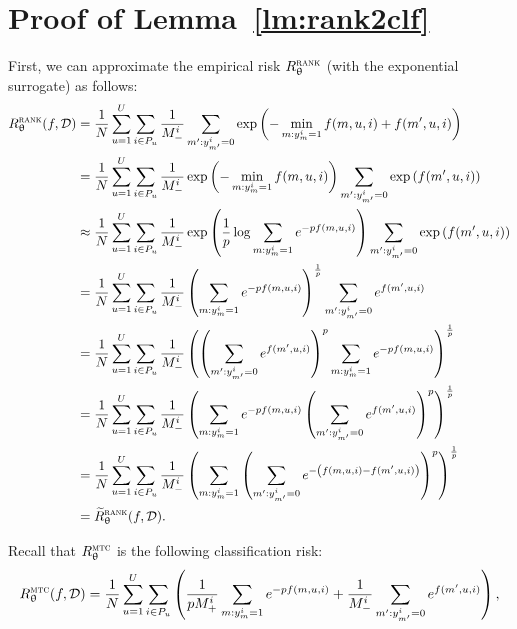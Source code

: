 \section{Proof of Lemma~\ref{lm:rank2clf}}

First, we can approximate the empirical risk $R_{\uptheta}^{\textsc{rank}}$ (with the exponential surrogate) as follows:
\begin{equation*}
\begin{aligned}
R_{\uptheta}^{\textsc{rank}}(f, \mathcal{D})
&= \frac{1}{N} \sum_{u=1}^U \sum_{i \in P_u} \frac{1}{M_-^i} \sum_{m': y_{m'}^i = 0} \exp \left( -\min_{m: y_m^i = 1} f(m, u, i) + f(m', u, i) \right) \\
&= \frac{1}{N} \sum_{u=1}^U \sum_{i \in P_u} \frac{1}{M_-^i} \exp \left( -\min_{m: y_m^i = 1} f(m, u, i) \right) 
   \sum_{m': y_{m'}^i = 0} \exp \left( f(m', u, i) \right) \\
&\approx \frac{1}{N} \sum_{u=1}^U \sum_{i \in P_u} \frac{1}{M_-^i} \exp \left( \frac{1}{p} \log \sum_{m: y_m^i = 1} e^{-p f(m, u, i)} \right)
   \sum_{m': y_{m'}^i = 0} \exp \left( f(m', u, i) \right) \\
&= \frac{1}{N} \sum_{u=1}^U \sum_{i \in P_u} \frac{1}{M_-^i} \left( \sum_{m: y_m^i = 1} e^{-p f(m, u, i)} \right)^\frac{1}{p} 
   \sum_{m': y_{m'}^i = 0} e^{f(m', u, i)} \\
&= \frac{1}{N} \sum_{u=1}^U \sum_{i \in P_u} \frac{1}{M_-^i} \left( \left( \sum_{m': y_{m'}^i = 0} e^{f(m', u, i)} \right)^p 
   \sum_{m: y_m^i = 1} e^{-p f(m, u, i)} \right)^\frac{1}{p} \\
&= \frac{1}{N} \sum_{u=1}^U \sum_{i \in P_u} \frac{1}{M_-^i} \left( 
   \sum_{m: y_m^i = 1} e^{-p f(m, u, i)} \left( \sum_{m': y_{m'}^i = 0} e^{f(m', u, i)} \right)^p \right)^\frac{1}{p} \\
&= \frac{1}{N} \sum_{u=1}^U \sum_{i \in P_u} \frac{1}{M_-^i} \left( 
   \sum_{m: y_m^i = 1} \left( \sum_{m': y_{m'}^i = 0} e^{- \left( f(m, u, i) - f(m', u, i) \right)} \right)^p \right)^\frac{1}{p} \\
&= \widetilde R_{\uptheta}^{\textsc{rank}}(f, \mathcal{D}).
\end{aligned}
\end{equation*}

Recall that $R_{\uptheta}^\textsc{mtc}$ is the following classification risk:
\begin{equation*}
R_{\uptheta}^{\textsc{mtc}}(f, \mathcal{D})
= \frac{1}{N} \sum_{u=1}^U \sum_{i \in P_u} \left( 
  \frac{1}{p M_+^i} \sum_{m: y_m^i = 1} e^{-p f(m, u, i)} 
  + \frac{1}{M_-^i} \sum_{m': y_{m'}^i = 0} e^{f(m', u, i)} \right),
\end{equation*}

